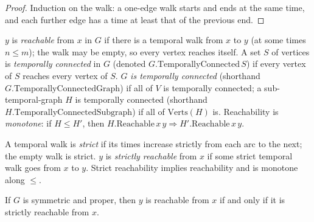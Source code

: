 \begin{proof}
  \leanok
  Induction on the walk: a one-edge walk starts and ends at the same time, and each further edge has a time at least that of the previous end.
\end{proof}

\begin{definition}
  \label{def:reachable}
  \leanok
  $y$ is \emph{reachable} from $x$ in $G$ if there is a temporal walk from $x$ to
  $y$ (at some times $n \le m$); the walk may be empty, so every vertex reaches
  itself. A set $S$ of vertices is
  \emph{temporally connected} in $G$ (denoted $G.\mathrm{TemporallyConnected}\,S$)
  if every vertex of $S$ reaches every vertex of $S$. $G$ \emph{is temporally
  connected} (shorthand $G.\mathrm{TemporallyConnectedGraph}$) if all of $V$
  is temporally connected; a sub-temporal-graph $H$ is temporally connected
  (shorthand $H.\mathrm{TemporallyConnectedSubgraph}$) if all of $\mathrm{Verts}(H)$
  is. Reachability is \emph{monotone}: if $H \le H'$, then
  $H.\mathrm{Reachable}\,x\,y \Rightarrow H'.\mathrm{Reachable}\,x\,y$.
\end{definition}

\begin{definition}
  \label{def:strict-reachable}
  \leanok
  A temporal walk is \emph{strict} if its times increase strictly from each arc
  to the next; the empty walk is strict. $y$ is \emph{strictly reachable} from
  $x$ if some strict temporal walk goes from $x$ to $y$. Strict reachability
  implies reachability and is monotone along $\le$.
\end{definition}

\begin{lemma}
  \label{lem:reachable-iff-strict}
  \leanok
  If $G$ is symmetric and proper, then $y$ is reachable from $x$ if and only if
  it is strictly reachable from $x$.
\end{lemma}

